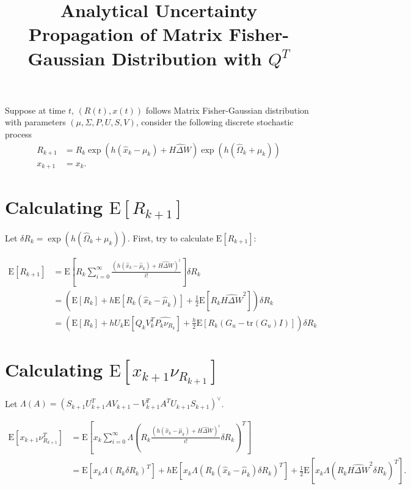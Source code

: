 \documentclass[10pt]{article}
\title{\vspace{-4ex}\textbf{Analytical Uncertainty Propagation of Matrix Fisher-Gaussian Distribution with $Q^T$\vspace{-4ex}}}
\date{}
\newcommand{\tr}[1]{\ensuremath{\mathrm{tr}\left( #1 \right)}}
\newcommand{\expect}[1]{\ensuremath{\mathrm{E}\left[ #1 \right]}}
\begin{document}
\maketitle

Suppose at time $t$, $(R(t),x(t))$ follows Matrix Fisher-Gaussian distribution with parameters $(\mu,\Sigma,P,U,S,V)$, consider the following discrete stochastic process
\begin{align*}
	R_{k+1} &= R_k\exp\left(h(\hat{x}_k-\mu_k) + \widehat{H\Delta W}\right) \exp\left(h(\hat{\Omega}_k + \mu_k)\right) \\
	x_{k+1} &= x_k.
\end{align*}

\section{Calculating $\expect{R_{k+1}}$}
Let $\delta R_k = \exp\left(h(\hat{\Omega}_k + \mu_k)\right)$.
First, try to calculate $\expect{R_{k+1}}$:

\begin{align*}
	\expect{R_{k+1}} &= \expect{R_k\sum_{i=0}^{\infty}\frac{\left(h(\hat{x}_k-\hat{\mu}_k) + \widehat{H\Delta W}\right)^i}{i!}} \delta R_k \\
	&= \left(\expect{R_k} + h\expect{R_k(\hat{x}_k-\hat{\mu}_k)} + \frac{1}{2}\expect{R_k\widehat{H\Delta W}^2}\right) \delta R_k \\
	&= \left(\expect{R_k} + hU_k\expect{Q_kV_k^T\widehat{P_k\nu_{R_k}}} + \frac{h}{2}\expect{R_k(G_u-\tr{G_u}I)}\right) \delta R_k
\end{align*}

\section{Calculating $\expect{x_{k+1}\nu_{R_{k+1}}}$}
Let $\Lambda(A) = (S_{k+1}U_{k+1}^TAV_{k+1}-V_{k+1}^TA^TU_{k+1}S_{k+1})^\vee$.

\begin{align*}
	\expect{x_{k+1}\nu_{R_{k+1}}^T} &= \expect{x_k \sum_{i=0}^\infty \Lambda\left(R_k \frac{\left(h(\hat{x}_k-\hat{\mu}_k) + \widehat{H\Delta W}\right)^i}{i!}\delta R_k\right)^T} \\
	&= \expect{x_k\Lambda(R_k\delta R_k)^T} + h\expect{x_k\Lambda(R_k(\hat{x}_k-\hat{\mu}_k)\delta R_k)^T} + \frac{1}{2}\expect{x_k\Lambda(R_k\widehat{H\Delta W}^2\delta R_k)^T}.
\end{align*}
\end{document}
